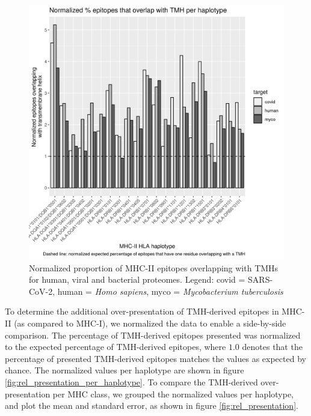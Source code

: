 \begin{figure}[!htbp]
  \includegraphics[width=\textwidth]{bbbq_1_smart_results/fig_f_tmh_mhc2_2_normalized_bw.png}
  \caption{
    Normalized proportion of MHC-II epitopes overlapping with TMHs
    for human, viral and bacterial proteomes.
    Legend: covid = SARS-CoV-2,
    human = \emph{Homo sapiens}, myco = \emph{Mycobacterium tuberculosis}
  }
  \label{fig:f_tmh_mhc2_normalized}
\end{figure}

To determine the additional over-presentation of TMH-derived epitopes 
in MHC-II (as compared to MHC-I), we normalized the data to enable
a side-by-side comparison. 
The percentage of TMH-derived epitopes presented was normalized
to the expected percentage of TMH-derived epitopes,
where $1.0$ denotes that the percentage of presented TMH-derived epitopes
matches the values as expected by chance.
The normalized values per haplotype are shown 
in figure \ref{fig:rel_presentation_per_haplotype}.
To compare the TMH-derived over-presentation per MHC class,
we grouped the normalized values per haplotype, 
and plot the mean and standard error, as shown in figure \ref{fig:rel_presentation}.

